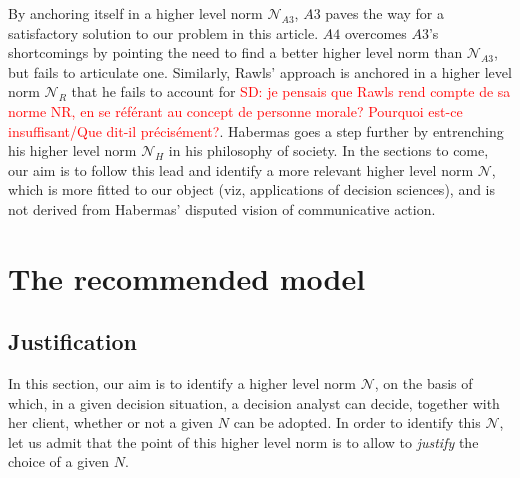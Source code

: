 \documentclass[preprint, french, english, 11pt, authoryear]{elsarticle}%
\newcommand{\commentSD}[1]{\textcolor{red}{SD: #1}}
\newcommand{\adv}{\mathscr{N}}
\begin{document}
By anchoring itself in a higher level norm $\mathscr{N}_{A3}$, $A3$ paves the way for a satisfactory solution to our problem in this article. $A4$ overcomes $A3$'s shortcomings by pointing the need to find a better higher level norm than $\mathscr{N}_{A3}$, but fails to articulate one. Similarly, Rawls' approach is anchored in a higher level norm $\mathscr{N}_{R}$ that he fails to account for \commentSD{je pensais que Rawls rend compte de sa norme NR, en se référant au concept de personne morale? Pourquoi est-ce insuffisant/Que dit-il précisément?}. Habermas goes a step further by entrenching his higher level norm $\mathscr{N}_{H}$ in his philosophy of society. In the sections to come, our aim is to follow this lead and identify a more relevant higher level norm $\adv$, which is more fitted to our object (viz, applications of decision sciences), and is not derived from Habermas' disputed vision of communicative action.

\section{The recommended model}
\subsection{Justification}
In this section, our aim is to identify a higher level norm $\adv$, on the basis of which, in a given decision situation, a decision analyst can decide, together with her client, whether or not a given $N$ can be adopted. In order to identify this $\adv$, let us admit that the point of this higher level norm is to allow to \emph{justify} the choice of a given $N$.
\end{document}
